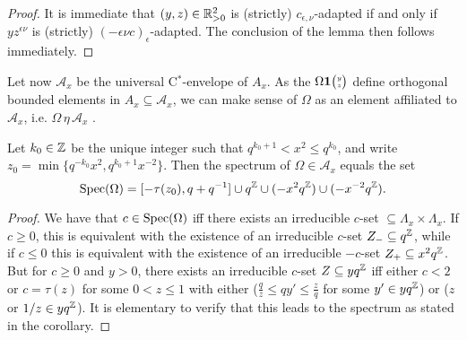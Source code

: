 \begin{proof} It is immediate that $(y,z)\in \mathbb{R}_{>0}^2$ is (strictly) $c_{\epsilon,\nu}$-adapted if and only if $yz^{\epsilon\nu}$ is (strictly) $(-\epsilon\nu c)_{\epsilon}$-adapted. The conclusion of the lemma then follows immediately.
\end{proof}

Let now $\mathcal{A}_x$ be the universal C$^*$-envelope of $A_x$. As the $\Omega\mathbf{1}{\tiny {\begin{pmatrix} y\\z\end{pmatrix}}}$ define orthogonal bounded elements in $A_x\subseteq \mathcal{A}_x$, we can make sense of $\Omega$ as an element affiliated to $\mathcal{A}_x$, i.e. $\Omega\,\eta\,\mathcal{A}_x$ \cite{Wor2}. 

\begin{Cor} Let $k_0\in \mathbb{Z}$ be the unique integer such that $q^{k_0+1}<x^2\leq q^{k_0}$, and write $z_{0} = \min \{q^{-k_0}x^2,q^{k_0+1}x^{-2}\}$. Then the spectrum of $\Omega \in \mathcal{A}_x$ equals the set \[\operatorname{\mathrm{Spec}}(\Omega) = \lbrack -\tau(z_0),q+q^{-1}\rbrack \cup q^{\mathbb{Z}}\cup (-x^2q^{\mathbb{Z}}) \cup (-x^{-2}q^{\mathbb{Z}}).\]
\end{Cor}
\begin{proof} We have that $c \in \operatorname{\mathrm{Spec}}(\Omega)$ iff there exists an irreducible $c$-set $\subseteq \Lambda_x\times \Lambda_x$. If $c\geq 0$, this is equivalent with the existence of an irreducible $c$-set $Z_- \subseteq q^{\mathbb{Z}}$, while if $c\leq 0$ this is equivalent with the existence of an irreducible $-c$-set $Z_+ \subseteq x^2q^{\mathbb{Z}}$. But for $c\geq0$ and $y>0$, there exists an irreducible $c$-set $Z\subseteq yq^{\mathbb{Z}}$ iff either $c<2$ or $c=\tau(z)$ for some $0<z\leq 1$ with either ($\frac{q}{z}\leq qy' \leq \frac{z}{q}$ for some $y'\in yq^{\mathbb{Z}}$) or ($z$ or $1/z \in yq^{\mathbb{Z}}$). It is elementary to verify that this leads to the spectrum as stated in the corollary.
\end{proof}



%

%


